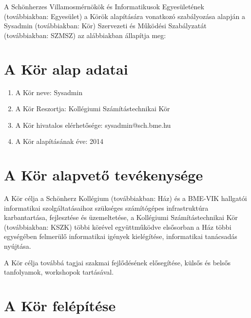 \documentclass[12pt]{article}
\begin{document}
\FirstPage
\pagebreak

A Schönherzes Villamosmérnökök és Informatikusok Egyesületének (továbbiakban: Egyesület) a
Körök alapítására vonatkozó szabályozása alapján a Sysadmin (továbbiakban: Kör)
\linebreak
Szervezeti és
Működési Szabályzatát (továbbiakban: SZMSZ) az alábbiakban állapítja meg:

\section{A Kör alap adatai}

\begin{enumerate}
  \item A Kör neve: Sysadmin
  \item A Kör Reszortja: Kollégiumi Számítástechnikai Kör
  \item A Kör hivatalos elérhetősége: sysadmin@sch.bme.hu
  \item A Kör alapításának éve: 2014
\end{enumerate}


\section{A Kör alapvető tevékenysége}

A Kör célja a Schönherz Kollégium (továbbiakban: Ház) és a BME-VIK hallgatói informatikai
szolgáltatásaihoz szükséges számítógépes infrastruktúra karbantartása, fejlesztése és üzemeltetése,
a Kollégiumi Számítástechnikai Kör (továbbiakban: KSZK) többi körével együttműködve elsősorban a
Ház többi egységében felmerülő informatikai igények kielégítése, informatikai tanácsadás nyújtása.

A Kör célja továbbá tagjai szakmai fejlődésének elősegítése, külsős és belsős tanfolyamok,
workshopok tartásával.


\section{A Kör felépítése}
\end{document}
